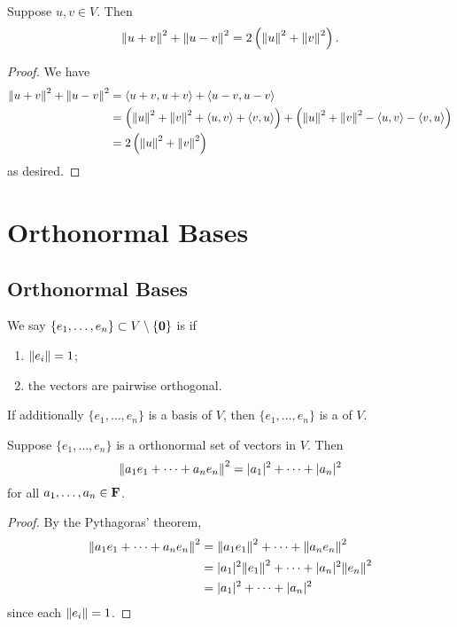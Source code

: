 \begin{lemma}
Suppose $u,v\in V$. Then
\begin{equation}
\norm{u+v}^2+\norm{u-v}^2=2\left(\norm{u}^2+\norm{v}^2\right).
\end{equation}
\end{lemma}

\begin{proof}
We have
\begin{align*}
\norm{u+v}^2+\norm{u-v}^2
&=\left\langle u+v,u+v\right\rangle+\left\langle u-v,u-v\right\rangle\\
&=\left(\norm{u}^2+\norm{v}^2+\left\langle u,v\right\rangle+\left\langle v,u\right\rangle\right)+\left(\norm{u}^2+\norm{v}^2-\left\langle u,v\right\rangle-\left\langle v,u\right\rangle\right)\\
&=2\left(\norm{u}^2+\norm{v}^2\right)
\end{align*}
as desired.
\end{proof}
\pagebreak

\section{Orthonormal Bases}
\subsection{Orthonormal Bases}
\begin{definition}
We say $\{e_1,\dots,e_n\}\subset V\setminus\{\vb{0}\}$ is  if
\begin{enumerate}[label=(\roman*)]
\item $\norm{e_i}=1$;
\item the vectors are pairwise orthogonal.
\end{enumerate}
If additionally $\{e_1,\dots,e_n\}$ is a basis of $V$, then $\{e_1,\dots,e_n\}$ is a  of $V$.
\end{definition}

\begin{lemma}
Suppose $\{e_1,\dots,e_n\}$ is a orthonormal set of vectors in $V$. Then
\[\norm{a_1e_1+\cdots+a_ne_n}^2=|a_1|^2+\cdots+|a_n|^2\]
for all $a_1,\dots,a_n\in\mathbf F$.
\end{lemma}

\begin{proof}
By the Pythagoras' theorem,
\begin{align*}
\norm{a_1e_1+\cdots+a_ne_n}^2
&=\norm{a_1e_1}^2+\cdots+\norm{a_ne_n}^2\\
&=|a_1|^2\norm{e_1}^2+\cdots+|a_n|^2\norm{e_n}^2\\
&=|a_1|^2+\cdots+|a_n|^2
\end{align*}
since each $\norm{e_i}=1$.
\end{proof}

